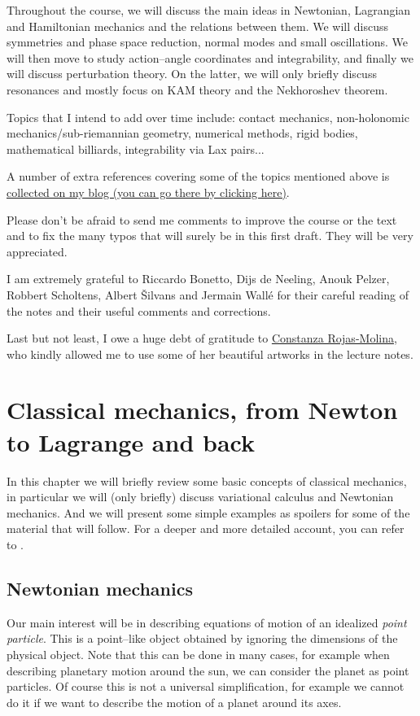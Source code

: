 \documentclass[english,fontsize=11pt,paper=a5,oneside]{scrbook}
\theoremstyle{definition}
\begin{document}
Throughout the course, we will discuss the main ideas in Newtonian, Lagrangian and Hamiltonian mechanics and the relations between them.
We will discuss symmetries and phase space reduction, normal modes and small oscillations.
We will then move to study action--angle coordinates and integrability, and finally we will discuss perturbation theory.
On the latter, we will only briefly discuss resonances and mostly focus on KAM theory and the Nekhoroshev theorem.

Topics that I intend to add over time include: contact mechanics, non-holonomic mechanics/sub-riemannian geometry, numerical methods, rigid bodies, mathematical billiards, integrability via Lax pairs...

A number of extra references covering some of the topics mentioned above is \href{https://www.mseri.me/links-from-hm/}{collected on my blog (you can go there by clicking here)}.

Please don't be afraid to send me comments to improve the course or the text and to fix the many typos that will surely be in this first draft. They will be very appreciated.

I am extremely grateful to Riccardo Bonetto, Dijs de Neeling, Anouk Pelzer, Robbert Scholtens, Albert \v{S}ilvans and Jermain Wall\'e for their careful reading of the notes and their useful comments and corrections.

Last but not least, I owe a huge debt of gratitude to \href{https://crojasmolina.com}{Constanza Rojas-Molina}, who kindly allowed me to use some of her beautiful artworks in the lecture notes.

\chapter{Classical mechanics, from Newton to Lagrange and back}

In this chapter we will briefly review some basic concepts of classical mechanics, in particular we will (only briefly) discuss variational calculus and Newtonian mechanics.
And we will present some simple examples as spoilers for some of the material that will follow.
For a deeper and more detailed account, you can refer to \cite{book:arnold,book:knauf}.

\section{Newtonian mechanics}

Our main interest will be in describing equations of motion of an idealized \emph{point particle}.
This is a point--like object obtained by ignoring the dimensions of the physical object. Note that this can be done in many cases, for example when describing planetary motion around the sun, we can consider the planet as point particles.
Of course this is not a universal simplification, for example we cannot do it if we want to describe the motion of a planet around its axes.
\end{document}
